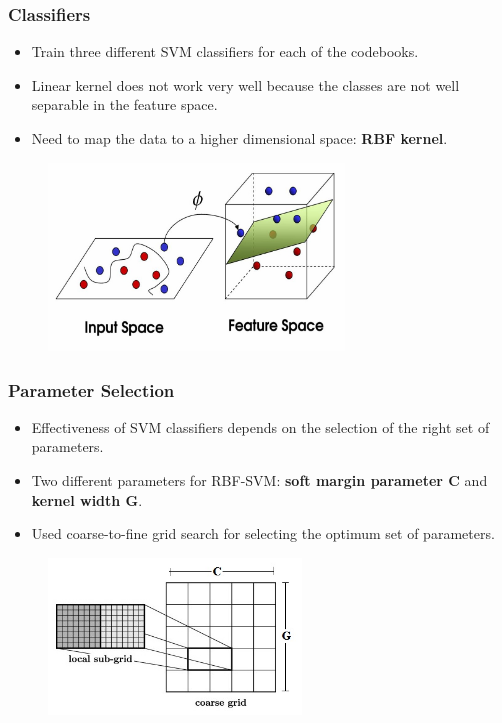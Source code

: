 \documentclass{beamer}
\begin{document}
\begin{frame}
\frametitle{Classifiers}
\begin{itemize}
\item<1-3> Train three different SVM classifiers for each of the codebooks.\\
\item<2-3> Linear kernel does not work very well because the classes are not well separable in the feature space.\\
\item<3> Need to map the data to a higher dimensional space: \textbf{RBF kernel}.\\
\end{itemize}
\begin{figure}
\includegraphics[width = 0.7\textwidth, height = 0.5\textheight]{svm}
\end{figure}
\end{frame}

\begin{frame}
\frametitle{Parameter Selection}
\begin{itemize}
\item<1-3> Effectiveness of SVM classifiers depends on the selection of the right set of parameters.
\item<2-3> Two different parameters for RBF-SVM: \textbf{soft margin parameter C} and \textbf{kernel width G}.
\item<3> Used coarse-to-fine grid search for selecting the optimum set of parameters.
\end{itemize}
\begin{figure}
\includegraphics[width = 0.6\textwidth, height =0.4\textheight]{gridsearch}
\end{figure}
\end{frame}
\end{document}
